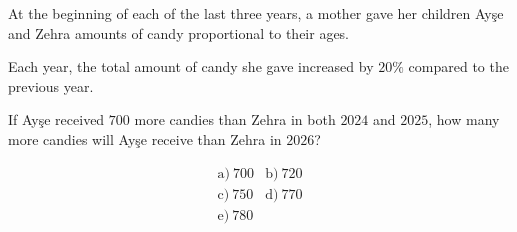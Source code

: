 At the beginning of each of the last three years, a mother gave her children Ay\c{s}e and Zehra amounts of candy proportional to their ages.



Each year, the total amount of candy she gave increased by \(20\%\) compared to the previous year.



If Ay\c{s}e received \(700\) more candies than Zehra in both \(2024\) and \(2025\), how many more candies will Ay\c{s}e receive than Zehra in \(2026\)?



\[
\begin{array}{ll}
\text{a)}\ 700 & \text{b)}\ 720 \\
\text{c)}\ 750 & \text{d)}\ 770 \\
\text{e)}\ 780
\end{array}
\]
